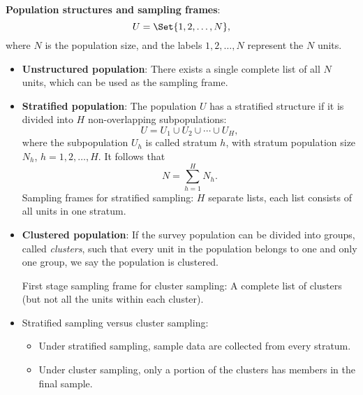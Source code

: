 \textbf{Population structures and sampling frames}:
\[ U=\Set{1,2,\ldots,N}, \]
where $ N $ is the population size, and the labels $ 1,2,\ldots,N $ represent
the $ N $ units.
\begin{itemize}
      \item \textbf{Unstructured population}:
            There exists a single complete list of all $N$ units, which can be
            used as the sampling frame.
      \item \textbf{Stratified population}:
            The population $U$ has a stratified structure if it is divided into $H$
            non-overlapping subpopulations:
            \[ U=U_1\cup U_2\cup\cdots\cup U_H, \]
            where the subpopulation $ U_h $ is called stratum $ h $, with stratum
            population size $ N_h $, $ h=1,2,\ldots,H $. It follows that
            \[ N=\sum_{h=1}^{H}N_h. \]
            Sampling frames for stratified sampling:
            $H$ separate lists, each list consists of all units in one stratum.
      \item \textbf{Clustered population}:
            If the survey population can be divided into groups, called
            \emph{clusters}, such that every unit in the population belongs to one
            and only one group, we say the population is clustered.

            First stage sampling frame for cluster sampling: A complete list of clusters (but not all the units within each
            cluster).
      \item Stratified sampling versus cluster sampling:
            \begin{itemize}
                  \item Under stratified sampling, sample data are collected from every
                        stratum.
                  \item Under cluster sampling, only a portion of the clusters has
                        members in the final sample.
            \end{itemize}
\end{itemize}

